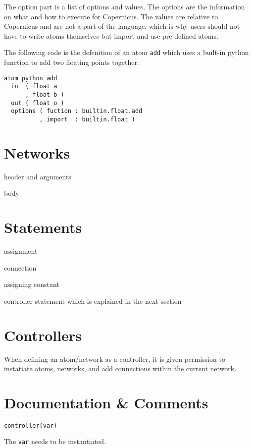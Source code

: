 The option part is a list of options and values. The options are the
information on what and how to execute for Copernicus. The values are
relative to Copernicus and are not a part of the language, which is
why users should not have to write atoms themselves but import and use
pre-defined atoms.

The following code is the defenition of an atom \verb#add# which uses
a built-in python function to add two floating points together.

\begin{verbatim}
atom python add
  in  ( float a
      , float b )
  out ( float o )
  options ( fuction : builtin.float.add
          , import  : builtin.float )
\end{verbatim}

\section{Networks}\label{sec:net}
header and arguments

body

\section{Statements} \label{sec:atom}
assignment

connection

assigning constant

controller statement which is explained in the next section

\section{Controllers}
When defining an atom/network as a controller, it is given permission
to instatiate atoms, networks, and add connections within the current
network.


\section{Documentation \& Comments}

\begin{verbatim}
controller(var)
\end{verbatim}

The \verb#var# needs to be instantiated.
